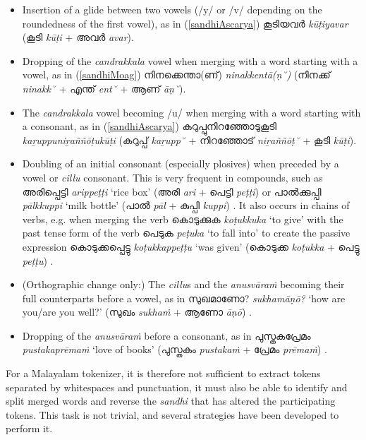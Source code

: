 \documentclass[a4paper]{article}
\begin{document}
\begin{itemize}
\item Insertion of a glide between two vowels (/y/ or /v/ depending on the roundedness of the first vowel), as in (\ref{sandhiAscarya}) കൂടിയവർ \textit{kūṭiyavar} (കൂടി \textit{kūṭi} + അവർ \textit{avar}).
\item Dropping of the \textit{candrakkala} vowel when merging with a word starting with a vowel, as in (\ref{sandhiMoag}) നിനക്കെന്താ(ണ്) \textit{ninakkentā(ṇ˘)} (നിനക്ക് \textit{ninakk˘} + എന്ത് \textit{ent˘} + ആണ് \textit{āṇ˘}).
\item The \textit{candrakkala} vowel becoming /u/ when merging with a word starting with a consonant, as in (\ref{sandhiAscarya}) കറുപ്പുനിറഞ്ഞോടുകൂടി \textit{kaṟuppuniṟaññōṭukūṭi} (കറുപ്പ് \textit{kaṟupp˘} + നിറഞ്ഞോട് \textit{niṟaññōṭ˘} + കൂടി \textit{kūṭi}).
\item Doubling of an initial consonant (especially plosives) when preceded by a vowel or \textit{cillu} consonant. This is very frequent in compounds, such as അരിപ്പെട്ടി \textit{arippeṭṭi} `rice box' (അരി \textit{ari} + പെട്ടി \textit{peṭṭi}) or പാൽക്കുപ്പി \textit{pālkkuppi} `milk bottle' (പാൽ \textit{pāl} + കുപ്പി \textit{kuppi}) \parencite[p.~397]{asherKumari}. It also occurs in chains of verbs, e.g. when merging the verb കൊടുക്കുക \textit{koṭukkuka} `to give' with the past tense form of the verb പെടുക \textit{peṭuka} `to fall into' to create the passive expression കൊടുക്കപ്പെട്ടു \textit{koṭukkappeṭṭu} `was given' (കൊടുക്ക \textit{koṭukka} + പെട്ടു \textit{peṭṭu}) \parencite[p.~269]{asherKumari}.
\item (Orthographic change only:) The \textit{cillu}s and the \textit{anusvāraṁ} becoming their full counterparts before a vowel, as in സുഖമാണോ? \textit{sukhamāṇō?} `how are you/are you well?' (സുഖം \textit{sukhaṁ} + ആണോ \textit{āṇō}) \parencite[p.~30]{moag}.
\item Dropping of the \textit{anusvāraṁ} before a consonant, as in പുസ്തകപ്രേമം \textit{pustakaprēmaṁ} `love of books' (പുസ്തകം \textit{pustakaṁ} + പ്രേമം \textit{prēmaṁ}) \parencite[p.~398]{asherKumari}.
\end{itemize}

For a Malayalam tokenizer, it is therefore not sufficient to extract tokens separated by whitespaces and punctuation, it must also be able to identify and split merged words and reverse the \textit{sandhi} that has altered the participating tokens. This task is not trivial, and several strategies have been developed to perform it.
\end{document}
